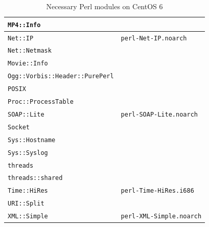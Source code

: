 \documentclass[a4paper,oneside,10pt]{report}
\begin{document}
\begin{table}
\begin{tabular}{|p{15em}|p{18em}|}
		\hline
		\verb|MP4::Info| 											& \\
		\hline
		\verb|Net::IP| 												& \verb|perl-Net-IP.noarch| \\
		\hline
		\verb|Net::Netmask| 									& \\
		\hline
		\verb|Movie::Info| 										& \\
		\hline
		\verb|Ogg::Vorbis::Header::PurePerl| 	& \\
		\hline
		\verb|POSIX| 													& \\
		\hline
		\verb|Proc::ProcessTable| 						& \\
		\hline
		\verb|SOAP::Lite| 										& \verb|perl-SOAP-Lite.noarch| \\
		\hline
		\verb|Socket| 												& \\
		\hline
		\verb|Sys::Hostname| 									& \\
		\hline
		\verb|Sys::Syslog| 										& \\
		\hline
		\verb|threads| 												& \\
		\hline
		\verb|threads::shared| 								& \\
		\hline
		\verb|Time::HiRes|										& \verb|perl-Time-HiRes.i686| \\
		\hline
		\verb|URI::Split| 										& \\
		\hline
		\verb|XML::Simple| 										& \verb|perl-XML-Simple.noarch| \\
		\hline
	\end{tabular}
	\caption{Necessary Perl modules on CentOS 6}
	\label{tab:NecessaryPerlModulesCentOS6}
\end{table}
\end{document}

